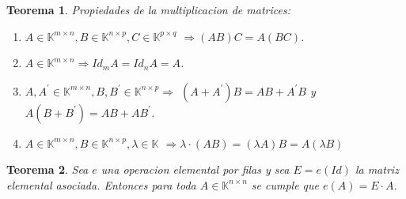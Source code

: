 \documentclass[]{article}
\newtheorem{theorem}{Teorema}
\begin{document}
\begin{theorem}
    Propiedades de la multiplicacion de matrices:
    \begin{enumerate}
        \item $A \in \mathbb{K}^{m\times n}, B \in \mathbb{K}^{n\times p},C \in \mathbb{K}^{p\times q}$
        $\Longrightarrow (AB)C=A(BC)$.
        \item $A \in \mathbb{K}^{m\times n} \Longrightarrow Id_mA = Id_nA = A$.
        \item $A,A^\prime \in \mathbb{K}^{m\times n}, B,B^\prime \in \mathbb{K}^{n\times p} \Longrightarrow$
        $(A+A^\prime)B = AB+A^\prime B$ y $A(B+B^\prime) = AB+AB^\prime$.
        \item $A \in \mathbb{K}^{m\times n}, B \in \mathbb{K}^{n\times p},\lambda \in \mathbb{K}$
        $\Longrightarrow \lambda \cdot (AB) = (\lambda A)B= A(\lambda B)$ 
    \end{enumerate}
\end{theorem}
\newpage
\begin{theorem}
    Sea $e$ una operacion elemental por filas y sea $E=e(Id)$ la matriz elemental asociada.
    Entonces para toda $A \in \mathbb{K}^{n\times n}$ se cumple que $e(A)=E \cdot A$. 
\end{theorem}
\end{document}
